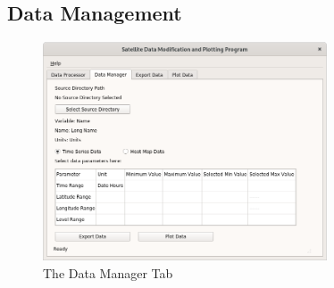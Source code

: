 \documentclass[../00_main.tex]{subfiles}
\begin{document}
\subsection{Data Management}

\begin{figure}[H]
    \center
    \includegraphics[width=0.75\textwidth]{../graphics/dm01}
    \caption{The Data Manager Tab}
    \label{dm01}
\end{figure}
\end{document}
